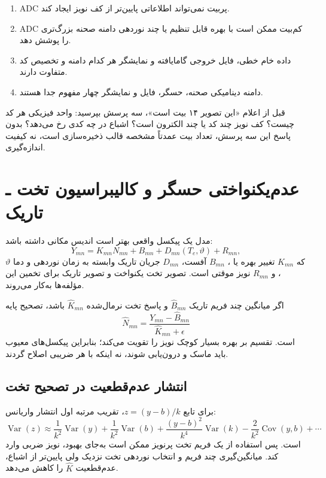 \documentclass[12pt,openany,oneside]{book}
\newcommand{\Var}{\operatorname{Var}}
\newcommand{\Cov}{\operatorname{Cov}}
\begin{document}
\begin{enumerate}
\item ADC پر‌بیت نمی‌تواند اطلاعاتی پایین‌تر از کف نویز ایجاد کند.
\item ADC کم‌بیت ممکن است با بهره قابل تنظیم یا چند نوردهی دامنه صحنه بزرگ‌تری را پوشش دهد.
\item داده خام خطی، فایل خروجی گامایافته و نمایشگر هر کدام دامنه و تخصیص کد متفاوت دارند.
\item دامنه دینامیکی صحنه، حسگر، فایل و نمایشگر چهار مفهوم جدا هستند.
\end{enumerate}

\begin{keybox}
قبل از اعلام «این تصویر ۱۴ بیت است»، سه پرسش بپرسید: واحد فیزیکی هر کد چیست؟ کف نویز چند کد یا
چند الکترون است؟ اشباع در چه کدی رخ می‌دهد؟ بدون پاسخ این سه پرسش، تعداد بیت عمدتاً مشخصه قالب
ذخیره‌سازی است، نه کیفیت اندازه‌گیری.
\end{keybox}


\section{عدم‌یکنواختی حسگر و کالیبراسیون تخت ـ تاریک}

مدل یک پیکسل واقعی بهتر است اندیس مکانی داشته باشد:
\begin{equation}
Y_{mn}=K_{mn}N_{mn}+B_{mn}+D_{mn}(T_e,\vartheta)+R_{mn},
\label{eq:nonuniform-sensor}
\end{equation}
که \(K_{mn}\) تغییر بهره یا ، \(B_{mn}\) آفست، \(D_{mn}\) جریان تاریک وابسته به زمان
نوردهی و دما \(\vartheta\)، و \(R_{mn}\) نویز موقتی است. تصویر تخت یکنواخت و تصویر تاریک برای
تخمین این مؤلفه‌ها به‌کار می‌روند.

اگر میانگین چند فریم تاریک \(\widehat B_{mn}\) و پاسخ تخت نرمال‌شده \(\widehat K_{mn}\) باشد،
تصحیح پایه
\begin{equation}
\widehat N_{mn}=\frac{Y_{mn}-\widehat B_{mn}}
{\widehat K_{mn}+\epsilon}
\label{eq:flat-field-correction}
\end{equation}
است. تقسیم بر بهره بسیار کوچک نویز را تقویت می‌کند؛ بنابراین پیکسل‌های معیوب باید ماسک و
درون‌یابی شوند، نه اینکه با هر ضریبی اصلاح گردند.

\subsection{انتشار عدم‌قطعیت در تصحیح تخت}

برای تابع \(z=(y-b)/k\)، تقریب مرتبه اول انتشار واریانس:
\begin{equation}
\Var(z)\approx
\frac{1}{k^2}\Var(y)
+\frac{1}{k^2}\Var(b)
+\frac{(y-b)^2}{k^4}\Var(k)
-\frac{2}{k^2}\Cov(y,b)+\cdots
\label{eq:flat-uncertainty}
\end{equation}
است. پس استفاده از یک فریم تخت پرنویز ممکن است به‌جای بهبود، نویز ضربی وارد کند. میانگین‌گیری
چند فریم و انتخاب نوردهی تخت نزدیک ولی پایین‌تر از اشباع، عدم‌قطعیت \(\widehat K\) را کاهش می‌دهد.
\end{document}
